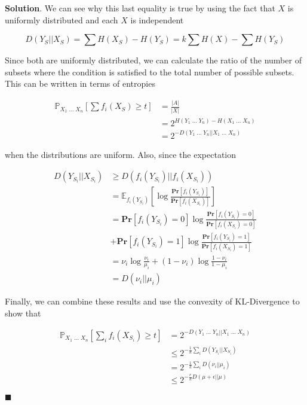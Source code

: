 \documentclass[12pt]{article}
\theoremstyle{definition}
\newenvironment{s}{%
        \begin{trivlist} \item \textbf{Solution}. }{%
            \hspace*{\fill} $\blacksquare$\end{trivlist}}%
\begin{document}
{\begin{s}
We can see why this last equality is true by using the fact that $X$ is uniformly distributed and each $X$ is independent

\begin{equation*}
D(Y_{S}||X_{S})  = \sum H(X_{S}) - H(Y_{S}) = k\sum H(X) - \sum H(Y_{S})
\end{equation*}

Since both are uniformly distributed, we can calculate the ratio of the number of subsets where the condition is satisfied to the total number of possible subsets. This can be written in terms of entropies

\begin{align*}
\mathbb{P}_{X_{1}\; ... \; X_{n}} \left[\sum f_{i}(X_{S}) \geq t\right] &= \frac{|A|}{|X|} \\
&= 2^{H(Y_{1} \; ... \; Y_{n}) - H(X_{1} \; ... \; X_{n})}\\
&= 2^{-D(Y_{1} \; ... \; Y_{n}||X_{1} \; ... \; X_{n})}
\end{align*}

when the distributions are uniform. Also, since the expectation 

\begin{align*}
D(Y_{S_{i}}||X_{S_{i}}) &\geq D(f_{i}(Y_{S_{i}})||f_{i}(X_{S_{i}})) \\
&= \mathbb{E}_{f_{i}(Y_{S_{i}})}\left[\log\frac{\mathbf{Pr}[f_{i}(Y_{S_{i}})]}{\mathbf{Pr}[f_{i}(X_{S_{i}})]} \right]\\
&= \mathbf{Pr}[f_{i}(Y_{S_{i}})=0]\log\frac{\mathbf{Pr}[f_{i}(Y_{S_{i}})=0]}{\mathbf{Pr}[f_{i}(X_{S_{i}})=0]} \\
&+ \mathbf{Pr}[f_{i}(Y_{S_{i}})=1]\log\frac{\mathbf{Pr}[f_{i}(Y_{S_{i}})=1]}{\mathbf{Pr}[f_{i}(X_{S_{i}})=1]}\\
&= \nu_{i}\log \frac{\nu_{i}}{\mu_{i}} + (1-\nu_{i})\log \frac{1-\nu_{i}}{1-\mu_{i}}\\
&= D(\nu_{i}||\mu_{i})
\end{align*}

Finally, we can combine these results and use the convexity of KL-Divergence to show that

\begin{align*}
\mathbb{P}_{X_{1}\; ... \; X_{n}} \left[\sum_{i} f_{i}(X_{S_{i}}) \geq t\right] &= 2^{-D(Y_{1} \; ... \; Y_{n}||X_{1} \; ... \; X_{n})}\\
&\leq 2^{-\frac{1}{k}\sum_{i} D(Y_{S_{i}}||X_{S_{i}})}\\
&= 2^{-\frac{1}{k}\sum_{i} D(\nu_{i}||\mu_{i})}\\
&\leq 2^{-\frac{r}{k}D(\mu + \epsilon||\mu)}
\end{align*}


\end{s}
\end{document}
